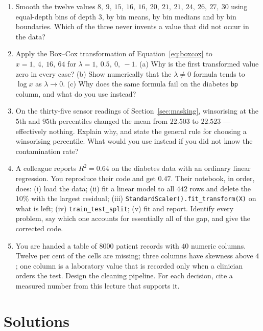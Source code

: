 \documentclass[11pt]{article}
\begin{document}
\begin{enumerate}[leftmargin=*]
  \item\label{q:bin} Smooth the twelve values
    $8,\ 9,\ 15,\ 16,\ 16,\ 20,\ 21,\ 21,\ 24,\ 26,\ 27,\ 30$ using
    equal-depth bins of depth $3$, by bin means, by bin medians and by bin
    boundaries. Which of the three never invents a value that did not occur in
    the data?

  \item\label{q:bc} Apply the Box--Cox transformation of
    Equation~\eqref{eq:boxcox} to $x = 1,\ 4,\ 16,\ 64$ for
    $\lambda = 1,\ 0.5,\ 0,\ -1$. (a) Why is the first transformed value zero
    in every case? (b) Show numerically that the $\lambda \neq 0$ formula tends
    to $\log x$ as $\lambda \to 0$. (c) Why does the same formula fail on the
    diabetes \texttt{bp} column, and what do you use instead?

  \item\label{q:wins} On the thirty-five sensor readings of
    Section~\ref{sec:masking}, winsorising at the $5$th and $95$th percentiles
    changed the mean from $22.503$ to $22.523$ --- effectively nothing.
    Explain why, and state the general rule for choosing a winsorising
    percentile. What would you use instead if you did not know the
    contamination rate?

  \item\label{q:debug} A colleague reports $R^2 = 0.64$ on the diabetes data
    with an ordinary linear regression. You reproduce their code and get
    $0.47$. Their notebook, in order, does: (i) load the data; (ii) fit a
    linear model to all $442$ rows and delete the $10\%$ with the largest
    residual; (iii) \texttt{StandardScaler().fit\_transform(X)} on what is
    left; (iv) \texttt{train\_test\_split}; (v) fit and report. Identify every
    problem, say which one accounts for essentially all of the gap, and give
    the corrected code.

  \item\label{q:design} You are handed a table of $8000$ patient records with
    $40$ numeric columns. Twelve per cent of the cells are missing; three
    columns have skewness above $4$; one column is a laboratory value that is
    recorded only when a clinician orders the test. Design the cleaning
    pipeline. For each decision, cite a measured number from this lecture that
    supports it.
\end{enumerate}

\section{Solutions}
\label{sec:solutions}
\end{document}

